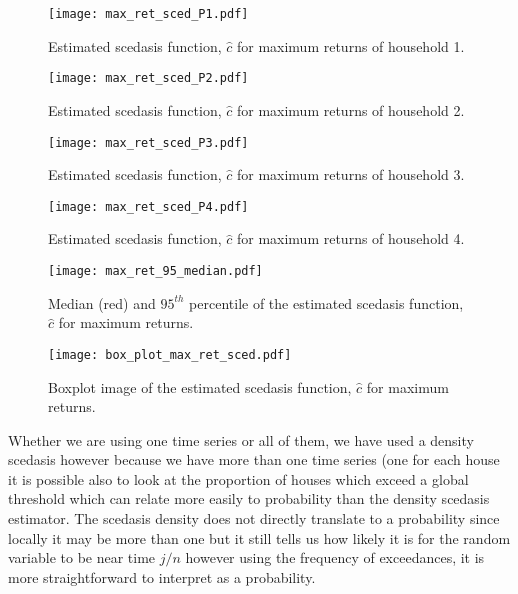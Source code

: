 \documentclass[a4paper]{article}
\begin{document}
\begin{figure}
\centering
\texttt{[image: max\_ret\_sced\_P1.pdf]}
\caption{\label{fig:max_ret_sced_P1} Estimated scedasis function, $\hat{c}$ for maximum returns of household 1.}
\end{figure}

\begin{figure}
\centering
\texttt{[image: max\_ret\_sced\_P2.pdf]}
\caption{\label{fig:max_ret_sced_P2} Estimated scedasis function, $\hat{c}$ for maximum returns of household 2.}
\end{figure}

\begin{figure}
\centering
\texttt{[image: max\_ret\_sced\_P3.pdf]}
\caption{\label{fig:max_ret_sced_P3} Estimated scedasis function, $\hat{c}$ for maximum returns of household 3.}
\end{figure}

\begin{figure}
\centering
\texttt{[image: max\_ret\_sced\_P4.pdf]}
\caption{\label{fig:max_ret_sced_P4} Estimated scedasis function, $\hat{c}$ for maximum returns of household 4.}
\end{figure}

\begin{figure}
\centering
\texttt{[image: max\_ret\_95\_median.pdf]}
\caption{\label{fig:max_ret_sced_95_50} Median (red) and $95^{th}$ percentile of the estimated scedasis function, $\hat{c}$ for maximum returns.}
\end{figure}

\begin{figure}
\centering
\texttt{[image: box\_plot\_max\_ret\_sced.pdf]}
\caption{\label{fig:max_ret_sced_boxplot} Boxplot image of the estimated scedasis function, $\hat{c}$ for maximum returns.}
\end{figure}


Whether we are using one time series or all of them, we have used a density scedasis however because we have more than one time series (one for each house it is possible also to look at the proportion of houses which exceed a global threshold which can relate more easily to probability than the density scedasis estimator. The scedasis density does not directly translate to a probability since locally it may be more than one but it still tells us how likely it is for the random variable to be near time $j/n$ however using the frequency of exceedances, it is more straightforward to interpret as a probability.
\end{document}
